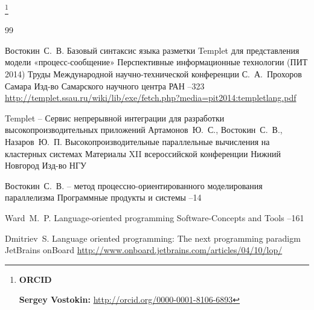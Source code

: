 %

\thanks{{\bf ORCID}

{\bf Sergey Vostokin:} \url{http://orcid.org/0000-0001-8106-6893}
}

\RusRef

\begin{thebibliography}{99}


\by Востокин~С.~В.
\paper Базовый синтаксис языка разметки Templet для представления модели «процесс-сообщение» 
\inbook Перспективные информационные технологии (ПИТ 2014)
\bookinfo Труды Международной научно-технической конференции 
\ed С.~А.~Прохоров
\publaddr Самара
\publ Изд-во Самарского научного центра РАН
--323
\elink \url{http://templet.ssau.ru/wiki/lib/exe/fetch.php?media=pit2014:templetlang.pdf}

\paper Templet – Сервис непрерывной интеграции для разработки высокопроизводительных приложений 
\by Артамонов~Ю.~С.,  Востокин~С.~В., Назаров~Ю.~П.
\inbook Высокопроизводительные параллельные вычисления на кластерных системах
\bookinfo Материалы XII всероссийской конференции
\publaddr Нижний Новгород
\publ Изд-во НГУ


\by Востокин~С.~В. 
 – метод процессно-ориентированного моделирования параллелизма 
\jour Программные продукты и системы
--14



\by Ward~M.~P. 
\paper Language-oriented programming 
\jour Software-Concepts and Tools
--161

\by Dmitriev~S.
\preprint Language oriented programming: The next programming paradigm 
\preprintinfo  JetBrains onBoard
\elink \url{http://www.onboard.jetbrains.com/articles/04/10/lop/}


\end{thebibliography}
